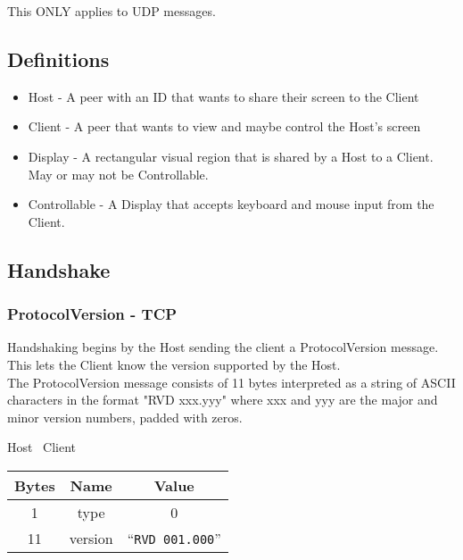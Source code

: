 This ONLY applies to UDP messages.

\subsection{Definitions}

\begin{itemize}
    \item Host - A peer with an ID that wants to share their screen to the Client
    \item Client - A peer that wants to view and maybe control the Host's screen
    \item Display - A rectangular visual region that is shared by a Host to a Client. May or may not be
    Controllable.
    \item Controllable - A Display that accepts keyboard and mouse input from the Client.
\end{itemize}

\subsection{Handshake}

\subsubsection{ProtocolVersion - TCP}
Handshaking begins by the Host sending the client a ProtocolVersion message. This lets the Client know the
version supported by the Host.\\

The ProtocolVersion message consists of 11 bytes interpreted as a string of ASCII characters in the format
"RVD xxx.yyy" where xxx and yyy are the major and minor version numbers, padded with zeros.

\begin{center}
    Host \textrightarrow\ Client\\
    \begin{tabular}{|c|c|c|}
        \hline
        \textbf{Bytes} & \textbf{Name} & \textbf{Value}           \\
        \hline
        1              & type          & 0                        \\
        \hline
        11             & version       & ``\texttt{RVD 001.000}'' \\
        \hline
    \end{tabular}
\end{center}

